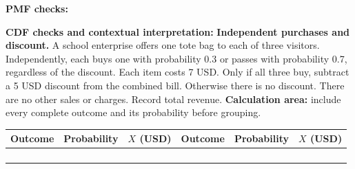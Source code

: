 \par%
\noindent%
\begin{minipage}[t]{.37\linewidth}%
  \vspace{0pt}\centering
\end{minipage}%
\hfill%
\begin{minipage}[t]{.60\linewidth}%
  \vspace{0pt}\centering
\end{minipage}%
\par
\textbf{PMF checks:} \hrulefill%
\par
{}
\par%
\noindent%
\begin{minipage}[t]{.37\linewidth}%
  \vspace{0pt}\centering
\end{minipage}%
\hfill%
\begin{minipage}[t]{.60\linewidth}%
  \vspace{0pt}\centering
\end{minipage}%
\par
\textbf{CDF checks and contextual interpretation:}
\vfill
\clearpage
{}
\textbf{Independent purchases and discount.} A school enterprise offers one tote bag to each of three
visitors. Independently, each buys one with probability 0.3 or passes with probability 0.7, regardless of the
discount. Each item costs 7 USD. Only if all three buy, subtract a 5 USD discount from the combined bill.
Otherwise there is no discount. There are no other sales or charges. Record total revenue.
\textbf{Calculation area:} include every complete outcome and its probability before grouping.
\par%
\noindent%
\begin{tabularx}{\linewidth}{|Y|Y|Y|Y|Y|Y|}%
  \hline Outcome & Probability & $X$ (USD) & Outcome & Probability & $X$ (USD)\\%
  \hline
  \rule{0pt}{.63cm}& & & & & \\%
  \hline
  \rule{0pt}{.63cm}& & & & & \\%
  \hline
  \rule{0pt}{.63cm}& & & & & \\%
  \hline
  \rule{0pt}{.63cm}& & & & & \\%
  \hline
\end{tabularx}
